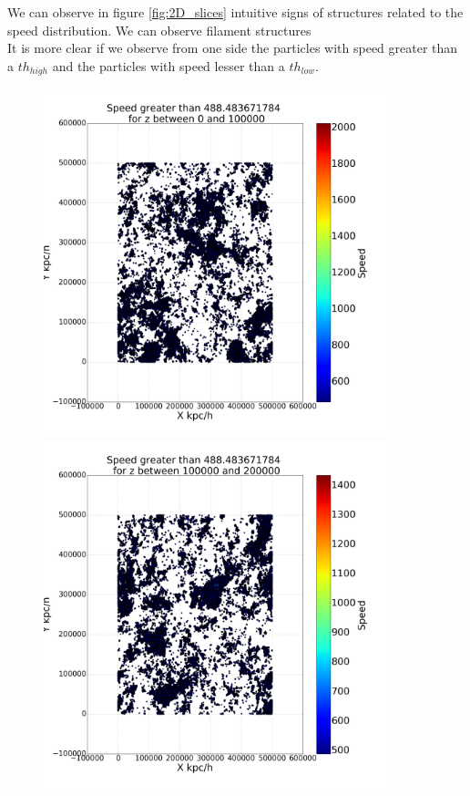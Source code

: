 \documentclass[12pt]{article}
\begin{document}
We can observe in figure \ref{fig:2D_slices} intuitive signs of structures related to the speed distribution. 
We can observe filament structures\\

It is more clear if we observe from one side the particles with speed greater than a $th_{high}$ and the particles with speed lesser than a $th_{low}$.\\

\begin{figure}[ht]
\centering
\begin{minipage}{.45\textwidth}
  \centering
  \includegraphics[width=0.9\textwidth]{graphs/scatter_magnitud_vel_488_lz_100000.png}
\end{minipage}%
\begin{minipage}{.45\textwidth}
  \centering
  \includegraphics[width=0.9\textwidth]{graphs/scatter_magnitud_vel_488_lz_200000.png}

\end{minipage}
\end{figure}
\end{document}
